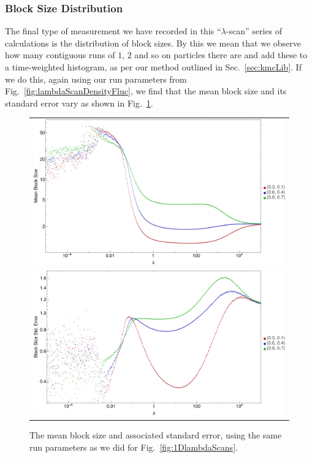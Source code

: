 \subsubsection{Block Size Distribution}
The final type of measurement we have recorded in this ``$\lambda$-scan'' series of calculations is
the distribution of block sizes. By this we mean that we observe how many contiguous runs of $1$, $2$ 
and so on particles there are and add these to a time-weighted histogram, as per our method outlined in
Sec.~\ref{sec:kmcLib}. If we do this, again using our run parameters from
Fig.~\ref{fig:lambdaScanDensityFluc}, we find that the mean block size and its standard error vary
as shown in Fig.~\ref{fig:blockSizeDistn}.
\begin{figure} \caption[The mean block size and its standard error.]{The mean block size and associated
standard error, using the same run parameters as we did for Fig.~\ref{fig:1DlambdaScans}.} 
\label{fig:blockSizeDistn}
\begin{center}
\begin{tabular}{c} 
\includegraphics[width=1.0\linewidth]{numerics/images/lambdaScan/blockSizeMeans} \\
\includegraphics[width=1.0\linewidth]{numerics/images/lambdaScan/blockSizeStdErr} \\
\end{tabular}
\end{center}
\end{figure}

